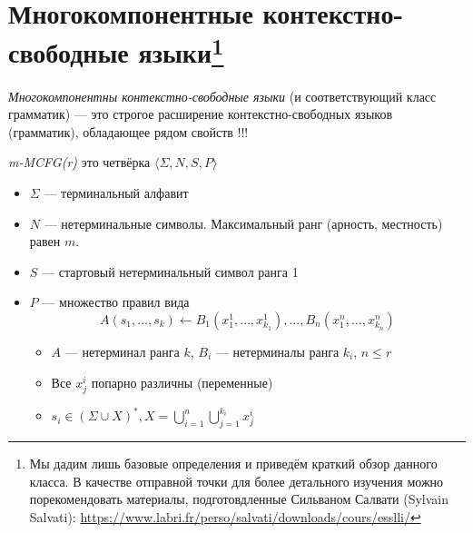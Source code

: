 \chapter[Многокомпонентные контекстно-свободные языки]{Многокомпонентные контекстно-свободные языки\footnote{Мы дадим лишь базовые определения и приведём краткий обзор данного класса. В качестве отправной точки для более детального изучения можно порекомендовать материалы, подготовдленные Сильваном Салвати (Sylvain Salvati): \url{https://www.labri.fr/perso/salvati/downloads/cours/esslli/}}}

\textit{Многокомпонентны контекстно-свободные языки} (и соответствующий класс грамматик) --- это строгое расширение контекстно-свободных языков (грамматик), обладающее рядом свойств !!!

\begin{definition}
    \textit{m-MCFG(r)} это четвёрка $\langle \Sigma, N, S, P \rangle$
    \begin{itemize}
      \item $\Sigma$ --- терминальный алфавит
      \item $N$ --- нетерминальные символы. Максимальный ранг (арность, местность) равен $m$.
      \item $S$ --- стартовый нетерминальный символ ранга 1
      \item $P$ --- множество правил вида
      $$
      A(s_1,\ldots,s_k) \leftarrow B_1(x_1^1,\ldots,x_{k_1}^1), \ldots, B_n(x_1^n,\ldots,x_{k_n}^n)
      $$
      \begin{itemize}
        \item $A$ --- нетерминал ранга $k$, $B_i$ --- нетерминалы ранга $k_i$, $n \leq r$
        \item Все $x^i_j$ попарно различны (переменные)
        \item $s_i \in (\Sigma \cup X)^*, X = \bigcup_{i=1}^n \bigcup_{j=1}^{k_i} {x^i_j}$
      \end{itemize}
  \end{itemize}
  \end{definition}

